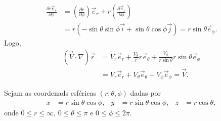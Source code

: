 \documentclass[a4paper,12pt, leqno, answers]{exam}
\newcommand{\devp}[2]{\frac{\partial #1}{\partial #2}}
\begin{document}
\begin{questions}
\begin{parts}
\begin{solution}
\begin{align*}
                \devp{r \vec{e}_r}{\phi} &= \left( \devp{r}{\phi} \right) \vec{e}_r + r \left( \devp{\vec{e}_r}{\phi} \right) \\
                &= r \left( - \sin \theta \sin \phi \vec{i} + \sin \theta \cos \phi \vec{j} \right) = r \sin \theta \vec{e}_\phi.
            \end{align*}
            Logo,
            \begin{align*}
                \left( \vec{V} \cdot \nabla \right) \vec{r} &= V_r \vec{e}_r + \frac{V_\theta}{r} r \vec{e}_\theta + \frac{V_\phi}{r \sin \theta} r \sin \theta \vec{e}_\phi \\
                &= V_r \vec{e}_r + V_\theta \vec{e}_\theta + V_\phi \vec{e}_\phi = \vec{V}.
            \end{align*}
        \end{solution}
    \end{parts}

    \question[T1 de 2012] Sejam as coordenads esf\'{e}ricas $(r, \theta, \phi)$ dadas por
    \begin{align*}
        x &= r \sin \theta \cos \phi, & y &= r \sin \theta \cos \phi, & z &= r \cos \theta,
    \end{align*}
    onde $0 \leq r \leq \infty$, $0 \leq \theta \leq \pi$ e $0 \leq \phi \leq 2 \pi$.
\end{questions}
\end{document}
